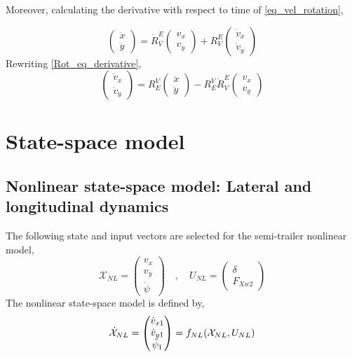 \documentclass[12pt]{article}
\begin{document}
Moreover, calculating the derivative with respect to time of \eqref{eq_vel_rotation},

\begin{equation}\label{Rot_eq_derivative}
    \begin{pmatrix} \ddot{x} \\ \ddot{y} \end{pmatrix} = \dot{R}^E_{V} \begin{pmatrix} v_{x} \\ v_{y} \end{pmatrix} + R^E_{V} \begin{pmatrix} \dot{v}_{x} \\ \dot{v}_{y} \end{pmatrix}
\end{equation}
Rewriting \eqref{Rot_eq_derivative},
\begin{equation}\label{velocity_fixed_unit_1_eq}
    \begin{pmatrix} \dot{v}_{x} \\ \dot{v}_{y} \end{pmatrix} = R^V_{E}  \begin{pmatrix} \ddot{x} \\ \ddot{y} \end{pmatrix} - R^V_{E} \dot{R}^E_{V} \begin{pmatrix} v_{x} \\ v_{y} \end{pmatrix} 
\end{equation}

\section{State-space model}

\subsection{Nonlinear state-space model: Lateral and longitudinal dynamics}
The following state and input vectors are selected for the semi-trailer nonlinear model,
\begin{equation}\label{NL_states_input}
    \mathcal{X}_{NL} = \begin{pmatrix} v_{x} \\ v_{y} \\ \Dot{\psi} \end{pmatrix} \quad , \quad U_{NL} = \begin{pmatrix} \delta \\ F_{Xw2} \end{pmatrix}
\end{equation}
The nonlinear state-space model is defined by,
\begin{equation} \label{Nonlinear_state_space_eq}
    \Dot{\mathcal{X}}_{NL} = \begin{pmatrix} \Dot{v}_{x1}  \\ \Dot{v}_{y1} \\ \Ddot{\psi}_1 \end{pmatrix} = f_{NL}(\mathcal{X}_{NL},U_{NL})
\end{equation}
\end{document}
